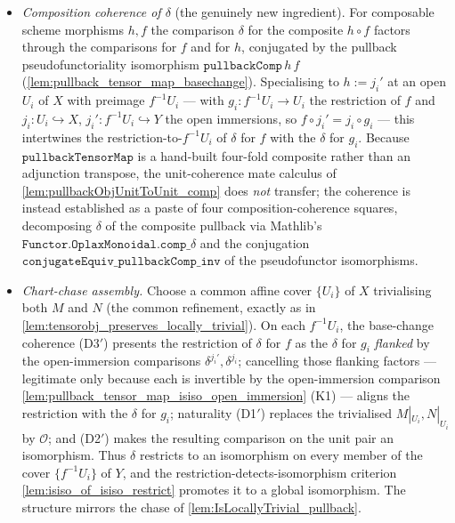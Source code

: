 \begin{itemize}
  \item[(D3$'$)] \emph{Composition coherence of \(\delta\)} (the genuinely new
    ingredient). For composable scheme morphisms \(h, f\) the comparison \(\delta\) for
    the composite \(h \circ f\) factors through the comparisons for \(f\) and for \(h\),
    conjugated by the pullback pseudofunctoriality isomorphism
    \(\mathtt{pullbackComp}\,h\,f\) (\cref{lem:pullback_tensor_map_basechange}).
    Specialising to \(h := j_i'\) at an open \(U_i\) of \(X\) with preimage
    \(f^{-1}U_i\) --- with \(g_i : f^{-1}U_i \to U_i\) the restriction of \(f\) and
    \(j_i : U_i \hookrightarrow X\), \(j_i' : f^{-1}U_i \hookrightarrow Y\) the open
    immersions, so \(f \circ j_i' = j_i \circ g_i\) --- this intertwines the
    restriction-to-\(f^{-1}U_i\) of \(\delta\) for \(f\) with the \(\delta\) for
    \(g_i\). Because \(\mathtt{pullbackTensorMap}\) is a hand-built four-fold composite
    rather than an adjunction transpose, the unit-coherence mate calculus of
    \cref{lem:pullbackObjUnitToUnit_comp} does \emph{not} transfer; the coherence is
    instead established as a paste of four composition-coherence squares, decomposing
    \(\delta\) of the composite pullback via Mathlib's
    \(\mathtt{Functor.OplaxMonoidal.comp\_}\delta\) and the conjugation
    \(\mathtt{conjugateEquiv\_pullbackComp\_inv}\) of the pseudofunctor isomorphisms.
  \item[(D4$'$)] \emph{Chart-chase assembly.} Choose a common affine cover \(\{U_i\}\)
    of \(X\) trivialising both \(M\) and \(N\) (the common refinement, exactly as in
    \cref{lem:tensorobj_preserves_locally_trivial}). On each \(f^{-1}U_i\), the
    base-change coherence (D3$'$) presents the restriction of \(\delta\) for \(f\) as the
    \(\delta\) for \(g_i\) \emph{flanked} by the open-immersion comparisons
    \(\delta^{j_i'}, \delta^{j_i}\); cancelling those flanking factors --- legitimate only
    because each is invertible by the open-immersion comparison
    \cref{lem:pullback_tensor_map_isiso_open_immersion} (K1) --- aligns the restriction with
    the \(\delta\) for \(g_i\); naturality (D1$'$) replaces the trivialised
    \(M|_{U_i}, N|_{U_i}\) by \(\mathcal{O}\); and (D2$'$) makes the resulting
    comparison on the unit pair an isomorphism. Thus \(\delta\) restricts to an
    isomorphism on every member of the cover \(\{f^{-1}U_i\}\) of \(Y\), and the
    restriction-detects-isomorphism criterion
    \cref{lem:isiso_of_isiso_restrict} promotes it to a global isomorphism. The
    structure mirrors the chase of \cref{lem:IsLocallyTrivial_pullback}.
\end{itemize}
